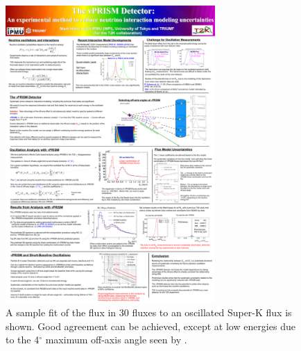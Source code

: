 \begin{figure}[htpb]
\begin{center}
      \includegraphics[width=8cm]{figures/nuprism_flux_fit.pdf}
\end{center}
\caption{A sample fit of the flux in 30 \nuprismlite fluxes to an oscillated Super-K flux is shown. Good agreement can be achieved, except at low energies due to the 4$^\circ$ maximum off-axis angle seen by \nuprismlite.}
\label{fig:fluxfit}
\end{figure}

